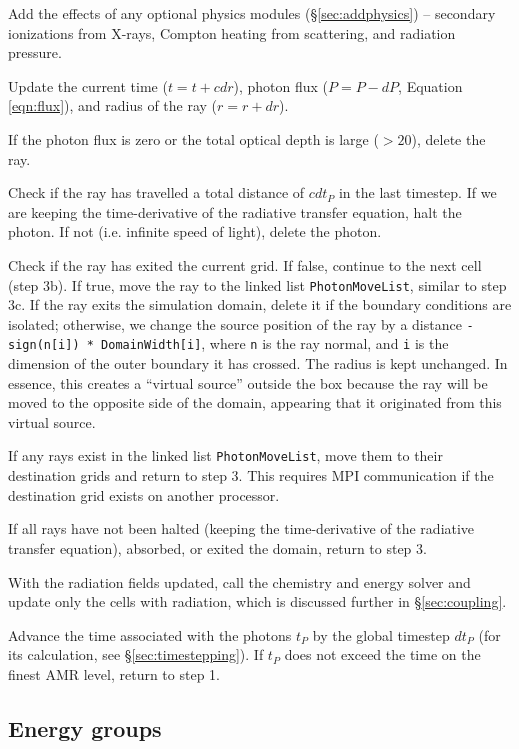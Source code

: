 \documentclass[useAMS,usenatbib,a4paper]{mn2e}
\begin{document}
 Add the effects of any optional physics modules
(\S\ref{sec:addphysics}) -- secondary ionizations from X-rays, Compton
heating from scattering, and radiation pressure.

 Update the current time ($t = t + cdr$), photon flux ($P = P
- dP$, Equation \ref{eqn:flux}), and radius of the ray ($r = r + dr$).

 If the photon flux is zero or the total optical depth is
large ($>20$), delete the ray.

 Check if the ray has travelled a total distance of $c dt_P$
in the last timestep.  If we are keeping the time-derivative of the
radiative transfer equation, halt the photon.  If not (i.e. infinite
speed of light), delete the photon.

 Check if the ray has exited the current grid.  If false,
continue to the next cell (step 3b).  If true, move the ray to the
linked list \texttt{PhotonMoveList}, similar to step 3c.  If the ray
exits the simulation domain, delete it if the boundary conditions are
isolated; otherwise, we change the source position of the ray by a
distance \texttt{-sign(n[i]) * DomainWidth[i]}, where \texttt{n} is
the ray normal, and \texttt{i} is the dimension of the outer boundary
it has crossed.  The radius is kept unchanged.  In essence, this
creates a ``virtual source'' outside the box because the ray will be
moved to the opposite side of the domain, appearing that it originated
from this virtual source.

 If any rays exist in the linked list \texttt{PhotonMoveList},
move them to their destination grids and return to step 3.  This
requires MPI communication if the destination grid exists on another
processor.

 If all rays have not been halted (keeping the time-derivative
of the radiative transfer equation), absorbed, or exited the domain,
return to step 3.

 With the radiation fields updated, call the chemistry and
energy solver and update only the cells with radiation, which is
discussed further in \S\ref{sec:coupling}.

 Advance the time associated with the photons $t_P$ by the
global timestep $dt_P$ (for its calculation, see
\S\ref{sec:timestepping}).  If $t_P$ does not exceed the time on the
finest AMR level, return to step 1.

\subsection{Energy groups}
\end{document}
